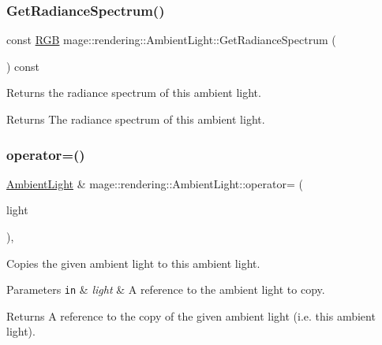 \subsubsection{\texorpdfstring{Get\+Radiance\+Spectrum()}{GetRadianceSpectrum()}}
{\footnotesize\ttfamily const \hyperlink{structmage_1_1_r_g_b}{R\+GB} mage\+::rendering\+::\+Ambient\+Light\+::\+Get\+Radiance\+Spectrum (\begin{DoxyParamCaption}{ }\end{DoxyParamCaption}) const\hspace{0.3cm}{\ttfamily [noexcept]}}

Returns the radiance spectrum of this ambient light.

\begin{DoxyReturn}{Returns}
The radiance spectrum of this ambient light. 
\end{DoxyReturn}
\hypertarget{classmage_1_1rendering_1_1_ambient_light_a351cdcd2e1b25c6a44356060f0e61c2b}{}\label{classmage_1_1rendering_1_1_ambient_light_a351cdcd2e1b25c6a44356060f0e61c2b} 
\subsubsection{\texorpdfstring{operator=()}{operator=()}\hspace{0.1cm}{\footnotesize\ttfamily [1/2]}}
{\footnotesize\ttfamily \hyperlink{classmage_1_1rendering_1_1_ambient_light}{Ambient\+Light} \& mage\+::rendering\+::\+Ambient\+Light\+::operator= (\begin{DoxyParamCaption}\item[{const \hyperlink{classmage_1_1rendering_1_1_ambient_light}{Ambient\+Light} \&}]{light }\end{DoxyParamCaption})\hspace{0.3cm}{\ttfamily [default]}, {\ttfamily [noexcept]}}

Copies the given ambient light to this ambient light.


\begin{DoxyParams}[1]{Parameters}
\mbox{\tt in}  & {\em light} & A reference to the ambient light to copy. \\
\hline
\end{DoxyParams}
\begin{DoxyReturn}{Returns}
A reference to the copy of the given ambient light (i.\+e. this ambient light). 
\end{DoxyReturn}
\hypertarget{classmage_1_1rendering_1_1_ambient_light_aa571cc046cb35ceafba6cb0a2ec4bd6c}{}\label{classmage_1_1rendering_1_1_ambient_light_aa571cc046cb35ceafba6cb0a2ec4bd6c} 
